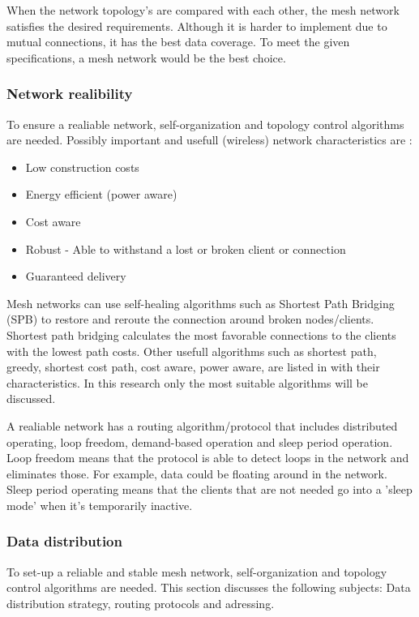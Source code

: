 \documentclass[10pt,a4paper]{article}
\begin{document}
When the network topology's are compared with each other, the mesh network satisfies the desired requirements. Although it is harder to implement due to mutual connections, it has the best data coverage. To meet the given specifications, a mesh network would be the best choice.

\newpage
\subsubsection{Network realibility}
To ensure a realiable network, self-organization and topology control algorithms are needed.\cite{WMN1} Possibly important and usefull (wireless) network characteristics are \cite{position-based}:
\begin{itemize}
\setlength\itemsep{0em}
    \item Low construction costs
    \item Energy efficient (power aware)
    \item Cost aware
    \item Robust - Able to withstand a lost or broken client or connection
    \item Guaranteed delivery
\end{itemize}

Mesh networks can use self-healing algorithms such as Shortest Path Bridging (SPB) to restore and reroute the connection around broken nodes/clients. Shortest path bridging calculates the most favorable connections to the clients with the lowest path costs. \cite{SPB} Other usefull algorithms such as shortest path, greedy, shortest cost path, cost aware, power aware, are listed in \cite{position-based} with their characteristics. In this research only the most suitable algorithms will be discussed. 

A realiable network has a routing algorithm/protocol that includes distributed operating, loop freedom, demand-based operation and sleep period operation. Loop freedom means that the protocol is able to detect loops in the network and eliminates those. For example, data could be floating around in the network. Sleep period operating means that the clients that are not needed go into a 'sleep mode' when it's temporarily inactive.\cite{position-based}

\newpage
\subsubsection{Data distribution}
To set-up a reliable and stable mesh network, self-organization and topology control algorithms are needed. \cite{WMN1}\cite{position-based} This section discusses the following subjects: Data distribution strategy, routing protocols and adressing.\\
\end{document}
